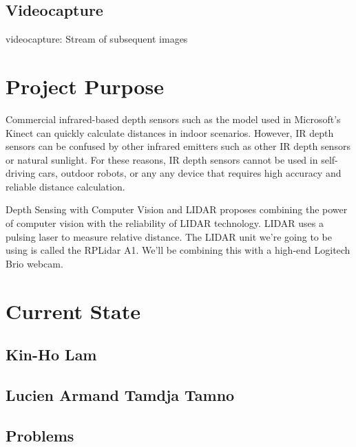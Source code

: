 \documentclass[onecolumn, draftclsnofoot,10pt, compsoc]{IEEEtran}
\begin{document}
\begin{singlespace}
		\subsection{Videocapture}\label{def:videocapture}
		videocapture: Stream of subsequent images
		
		
		
	\section{Project Purpose}
		Commercial infrared-based depth sensors such as the model used in Microsoft's Kinect can quickly calculate distances in indoor scenarios.
		However, IR depth sensors can be confused by other infrared emitters such as other IR depth sensors or natural sunlight.
		For these reasons, IR depth sensors cannot be used in self-driving cars, outdoor robots, or any any device that requires high accuracy and reliable distance calculation.

		Depth Sensing with Computer Vision and LIDAR proposes combining the power of computer vision with the reliability of LIDAR technology.
		LIDAR uses a pulsing laser to measure relative distance.
		The LIDAR unit we're going to be using is called the RPLidar A1.
		We'll be combining this with a high-end Logitech Brio webcam.

	\section{Current State}

	\subsection{Kin-Ho Lam}
		
	\subsection{Lucien Armand Tamdja Tamno}
	
	\subsection{Problems}
		
\end{singlespace}
\end{document}
